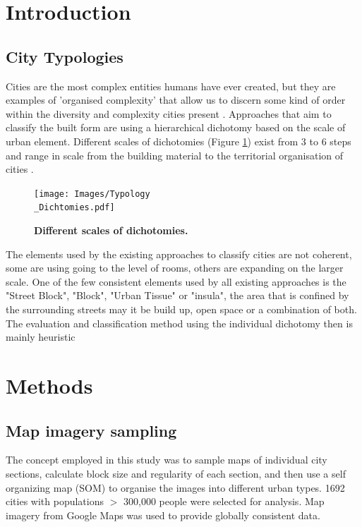 \documentclass{nature}
\begin{document}
\section{Introduction}\label{sec:introduction}


\subsection{City Typologies}\label{sec:introduction2}
Cities are the most complex entities humans have ever created, but they are examples of 'organised complexity' that allow us to discern some kind of order within the diversity and complexity cities present \cite{Kropf2014}. Approaches that aim to classify the built form are using a hierarchical dichotomy based on the scale of urban element. Different scales of dichotomies (Figure \ref{fig:TypologyDichtomies}) exist from 3 to 6 steps and range in scale from the building material to the territorial organisation of cities \cite{Lynch1981,Conzen1960,Caniggi1979,Castex1980,Mouden1988,Allain2004}.



\begin{figure}
\centering    
\texttt{[image: Images/Typology\\\_Dichtomies.pdf]}  
\caption{\bf Different scales of dichotomies. }    
 \label{fig:TypologyDichtomies}  
\end{figure} 


The elements used by the existing approaches to classify cities are not coherent, some are using going to the level of rooms, others are expanding on the larger scale. One of the few consistent elements used by all existing approaches is the "Street Block", "Block", "Urban Tissue" or "insula", the area that is confined by the surrounding streets may it be build up, open space or a combination of both.
The evaluation and classification method using the individual dichotomy then is mainly heuristic 



\section{Methods}\label{sec:Methods}

\subsection{Map imagery sampling}\label{sec:methods2}
The concept employed in this study was to sample maps of individual city sections, calculate block size and regularity of each section, and then use a self organizing map (SOM) to organise the images into different urban types. 1692 cities with populations $>$ 300,000 people \cite{UN2014} were selected for analysis. Map imagery from Google Maps \cite{GoogleStatic2017} was used to provide globally consistent data. 
\end{document}
